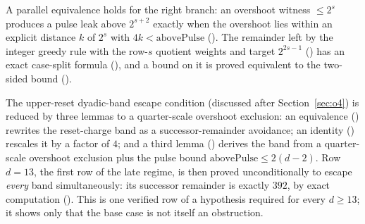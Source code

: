 A parallel equivalence holds for the right branch: an overshoot witness $\le2^s$ produces a
pulse leak above $2^{s+2}$ exactly when the overshoot lies within an explicit distance $k$ of
$2^s$ with $4k<\mathrm{abovePulse}$
().
The remainder left by the integer greedy rule with the row-$s$ quotient weights and target
$2^{2s-1}$ ()
has an exact case-split formula
(),
and a bound on it is proved equivalent to the two-sided bound
().

\begin{obs}
The upper-reset dyadic-band escape condition (discussed after Section~\ref{sec:o4}) is
reduced by three lemmas to a quarter-scale overshoot exclusion: an equivalence
()
rewrites the reset-charge band as a successor-remainder avoidance; an identity
()
rescales it by a factor of $4$; and a third lemma
()
derives the band from a quarter-scale overshoot exclusion plus the pulse bound $\mathrm{abovePulse}\le
2(d-2)$. Row $d=13$, the first row of the late regime, is then proved unconditionally to escape
\emph{every} band simultaneously: its successor remainder is exactly $392$, by exact
computation
().
This is one verified row of a hypothesis required for every $d\ge13$; it shows only that the
base case is not itself an obstruction.
\end{obs}


